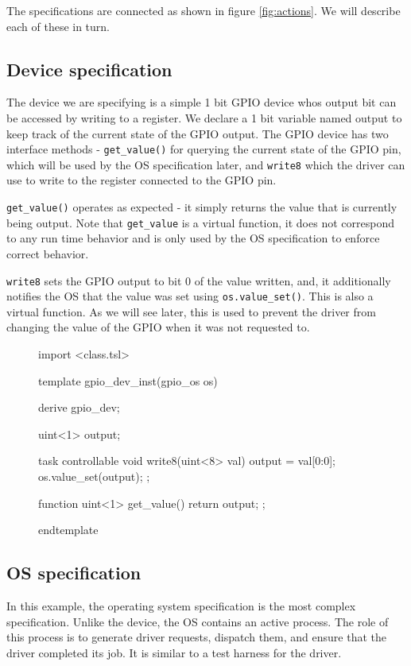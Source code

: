 \documentclass{article}
\newcommand{\code}[1]{\texttt{#1}}
\begin{document}
The specifications are connected as shown in figure \ref{fig:actions}. We will describe each of these in turn.

\subsection{Device specification}

The device we are specifying is a simple 1 bit GPIO device whos output bit can be accessed by writing to a register. We declare a 1 bit variable named output to keep track of the current state of the GPIO output. The GPIO device has two interface methods - \code{get\_value()} for querying the current state of the GPIO pin, which will be used by the OS specification later, and \code{write8} which the driver can use to write to the register connected to the GPIO pin. 

\code{get\_value()} operates as expected - it simply returns the value that is currently being output. Note that \code{get\_value} is a virtual function, it does not correspond to any run time behavior and is only used by the OS specification to enforce correct behavior. 

\code{write8} sets the GPIO output to bit 0 of the value written, and, it additionally notifies the OS that the value was set using \code{os.value\_set()}. This is also a virtual function. As we will see later, this is used to prevent the driver from changing the value of the GPIO when it was not requested to.

\begin{figure}[H]
\lstset{numbers=left}
\begin{tsllisting}
import <class.tsl>

template gpio_dev_inst(gpio_os os)

derive gpio_dev;

uint<1> output;

task controllable void write8(uint<8> val){
    output = val[0:0];
    os.value_set(output);
};

function uint<1> get_value(){
    return output;
};

endtemplate
\end{tsllisting}
\end{figure}

\subsection{OS specification}

In this example, the operating system specification is the most complex specification. Unlike the device, the OS contains an active process. The role of this process is to generate driver requests, dispatch them, and ensure that the driver completed its job. It is similar to a test harness for the driver. 
\end{document}
